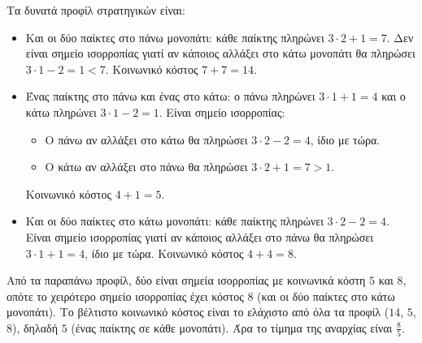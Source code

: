 \begin{center}
\end{center}


Τα δυνατά προφίλ στρατηγικών είναι:
\begin{itemize}
  \item Και οι δύο παίκτες στο πάνω μονοπάτι: κάθε παίκτης πληρώνει
    $3 \cdot 2 + 1 = 7$. Δεν είναι σημείο ισορροπίας γιατί αν κάποιος αλλάξει
    στο κάτω μονοπάτι θα πληρώσει $3 \cdot 1 - 2 = 1 < 7$. Κοινωνικό κόστος
    $7 + 7 = 14$.
  \item Ένας παίκτης στο πάνω και ένας στο κάτω: ο πάνω πληρώνει
    $3 \cdot 1 + 1 = 4$ και ο κάτω πληρώνει $3 \cdot 1 - 2 = 1$. Είναι σημείο
    ισορροπίας:
    \begin{itemize}
      \item Ο πάνω αν αλλάξει στο κάτω θα πληρώσει $3 \cdot 2 - 2 = 4$, ίδιο
        με τώρα.
      \item Ο κάτω αν αλλάξει στο πάνω θα πληρώσει $3 \cdot 2 + 1 = 7 > 1$.
    \end{itemize}
    Κοινωνικό κόστος $4 + 1 = 5$.
  \item Και οι δύο παίκτες στο κάτω μονοπάτι: κάθε παίκτης πληρώνει
    $3 \cdot 2 - 2 = 4$. Είναι σημείο ισορροπίας γιατί αν κάποιος αλλάξει στο
    πάνω θα πληρώσει $3 \cdot 1 + 1 = 4$, ίδιο με τώρα. Κοινωνικό κόστος
    $4 + 4 = 8$.
\end{itemize}

Από τα παραπάνω προφίλ, δύο είναι σημεία ισορροπίας με κοινωνικά κόστη $5$ και
$8$, οπότε το χειρότερο σημείο ισορροπίας έχει κόστος $8$ (και οι δύο παίκτες
στο κάτω μονοπάτι). Το βέλτιστο κοινωνικό κόστος είναι το ελάχιστο από όλα τα
προφίλ ($14$, $5$, $8$), δηλαδή $5$ (ένας παίκτης σε κάθε μονοπάτι). Άρα το
τίμημα της αναρχίας είναι $\frac{8}{5}$.
